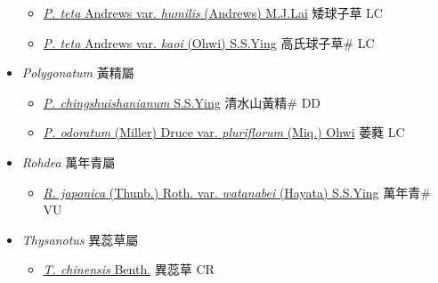 \begin{itemize}
  \begin{itemize}
        \item[] \href{http://www.theplantlist.org/tpl1.1/search?q=Peliosanthes+teta+var.+humilis}{\textit{P. teta} Andrews var. \textit{humilis} (Andrews) M.J.Lai}     矮球子草 LC
        \item[] \href{http://www.theplantlist.org/tpl1.1/search?q=Peliosanthes+teta+var.+kaoi}{\textit{P. teta} Andrews var. \textit{kaoi} (Ohwi) S.S.Ying}   高氏球子草\# LC
  \end{itemize}
 \item[] \textit{Polygonatum} 黃精屬
                    
  \begin{itemize}
        \item[] \href{http://www.theplantlist.org/tpl1.1/search?q=Polygonatum+chingshuishanianum}{\textit{P. chingshuishanianum} S.S.Ying}   清水山黃精\# DD
        \item[] \href{http://www.theplantlist.org/tpl1.1/search?q=Polygonatum+odoratum+var.+pluriflorum}{\textit{P. odoratum} (Miller) Druce var. \textit{pluriflorum} (Miq.) Ohwi}   萎蕤 LC
  \end{itemize}
 \item[] \textit{Rohdea} 萬年青屬
                    
  \begin{itemize}
        \item[] \href{http://www.theplantlist.org/tpl1.1/search?q=Rohdea+japonica+var.+watanabei}{\textit{R. japonica} (Thunb.) Roth. var. \textit{watanabei} (Hayata) S.S.Ying}     萬年青\# VU
  \end{itemize}
 \item[] \textit{Thysanotus} 異蕊草屬
                    
  \begin{itemize}
        \item[] \href{http://www.theplantlist.org/tpl1.1/search?q=Thysanotus+chinensis}{\textit{T. chinensis} Benth.}   異蕊草 CR
  \end{itemize}
  \end{itemize}
